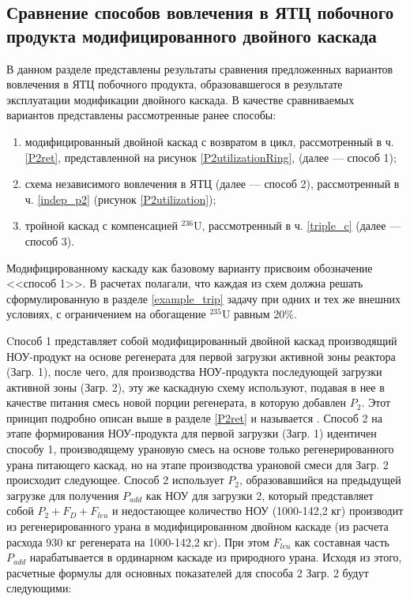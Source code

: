 \subsection{Сравнение способов вовлечения в ЯТЦ побочного продукта модифицированного двойного каскада}

В данном разделе представлены результаты сравнения предложенных вариантов вовлечения в ЯТЦ побочного продукта, образовавшегося в результате эксплуатации модификации двойного каскада. В качестве сравниваемых вариантов представлены рассмотренные ранее способы: 

\begin{enumerate}
    \item модифицированный двойной каскад с возвратом в цикл, рассмотренный в ч. \ref{P2ret}, представленной на рисунок \ref{P2utilizationRing}, (далее --- способ 1);
    \item схема независимого вовлечения в ЯТЦ (далее --- способ 2), рассмотренный в ч. \ref{indep_p2} (рисунок \ref{P2utilization});
    \item тройной каскад с компенсацией $^{236}$U, рассмотренный в ч. \ref{triple_c} (далее --- способ 3).
\end{enumerate}

Модифицированному каскаду как базовому варианту присвоим обозначение <<способ 1>>. В расчетах полагали, что каждая из схем должна решать сформулированную в разделе \ref{example_trip} задачу при одних и тех же внешних условиях, с ограничением на обогащение $^{235}$U равным 20\%.

Cпособ 1 представляет собой модифицированный двойной каскад производящий НОУ-продукт на основе регенерата для первой загрузки активной зоны реактора (Загр. 1), после чего, для производства НОУ-продукта последующей загрузки активной зоны (Загр. 2), эту же каскадную схему используют, подавая в нее в качестве питания смесь новой порции регенерата, в которую добавлен $P_2$. Этот принцип подробно описан выше в разделе \ref{P2ret} и называется . Способ 2 на этапе формирования НОУ-продукта для первой загрузки (Загр. 1) идентичен способу 1, производящему урановую смесь на основе только регенерированного урана питающего каскад, но на этапе производства урановой смеси для Загр. 2 происходит следующее. Способ 2 использует $P_2$, образовавшийся на предыдущей загрузке для получения $P_{add}$ как НОУ для загрузки 2, который представляет собой $P_2+F_D+F_{leu}$ и недостающее количество НОУ (1000-142,2 кг) производит из регенерированного урана в модифицированном двойном каскаде (из расчета расхода 930 кг регенерата на 1000-142,2 кг). При этом $F_{leu}$ как составная часть $P_{add}$ нарабатывается в ординарном каскаде из природного урана. Исходя из этого, расчетные формулы для основных показателей для способа 2 Загр. 2 будут следующими:

